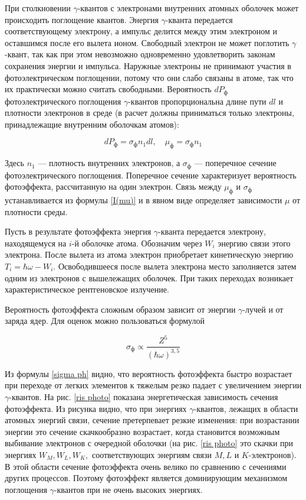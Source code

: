 При столкновении $\gamma$-квантов с электронами внутренних атомных оболочек
может происходить поглощение квантов. Энергия $\gamma$-кванта передается
соответствующему электрону, а импульс делится между этим электроном и оставшимся
после его вылета ионом. Свободный электрон не может поглотить $\gamma$-квант,
так как при этом невозможно одновременно удовлетворить законам сохранения
энергии и импульса. Наружные электроны не принимают участия в фотоэлектрическом
поглощении, потому что они слабо связаны в атоме, так что их практически можно
считать свободными. Вероятность $dP_{\text{ф}}$ фотоэлектрического поглощения
$\gamma$-квантов пропорциональна длине пути $dl$ и плотности электронов в
среде (в расчет должны приниматься только электроны, принадлежащие внутренним
оболочкам атомов):

\begin{equation}\label{mu ph}
dP_{\text{ф}} = \sigma_{\text{ф}} n_1 dl, \quad \mu_{\text{ф}} = \sigma_{\text{ф}} n_1
\end{equation}

Здесь $ n_1 $ --- плотность внутренних электронов, а $\sigma_{\text{ф}}$ --- поперечное
сечение фотоэлектрического поглощения. Поперечное сечение характеризует
вероятность фотоэффекта, рассчитанную на один электрон. Связь между $\mu_{\text{ф}}$ и
$ \sigma_{\text{ф}} $ устанавливается из формулы \eqref{I(mu)} и в явном виде определяет
зависимости $ \mu $ от плотности среды.

Пусть в результате фотоэффекта энергия $\gamma$-кванта передается электрону,
находящемуся на $ i $-й оболочке атома. Обозначим через $ W_i $ энергию связи
этого электрона. После вылета из атома электрон приобретает кинетическую энергию
$ T_i = \hbar \omega - W_i $. Освободившееся после вылета электрона место
заполняется затем одним из электронов с вышележащих оболочек. При таких
переходах возникает характеристическое рентгеновское излучение.

Вероятность фотоэффекта сложным образом зависит от энергии $\gamma$-лучей и от
заряда ядер. Для оценок можно пользоваться формулой

\begin{equation}\label{sigma ph}
\sigma_{\text{ф}} \propto \dfrac{Z^5}{(\hbar\omega)^{3,5}}
\end{equation}

Из формулы \eqref{sigma ph} видно, что вероятность фотоэффекта быстро возрастает
при переходе от легких элементов к тяжелым резко падает с увеличением энергии
$\gamma$-квантов. На рис. \ref{ris photo} показана энергетическая зависимость
сечения фотоэффекта. Из рисунка видно, что при энергиях $\gamma$-квантов,
лежащих в области атомных энергий связи, сечение претерпевает резкие изменения:
при возрастании энергии это сечение скачкообразно возрастает, когда становится
возможным выбивание электронов с очередной оболочки (на рис. \ref{ris photo} это
скачки при энергиях $ W_M, W_L, W_K, $ соответствующих энергиям связи $ M, L $
и $ K $-электронов). В этой области сечение фотоэффекта очень велико по
сравнению с сечениями других процессов. Поэтому фотоэффект является доминирующим
механизмом поглощения $\gamma$-квантов при не очень высоких энергиях.
